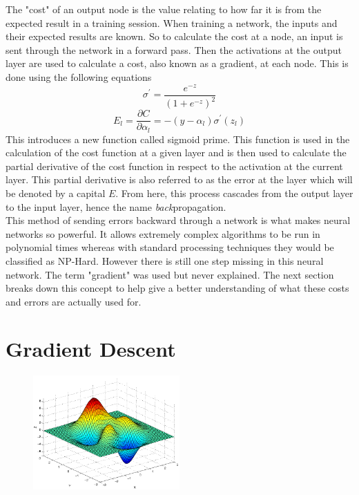 \documentclass[12pt]{article}
\theoremstyle{definition}
\theoremstyle{plain}
\begin{document}
The "cost" of an output node is the value relating to how far it is from the expected result in a training session. When training a network, the inputs and their expected results are known. So to calculate the cost at a node, an input is sent through the network in a forward pass. Then the activations at the output layer are used to calculate a cost, also known as a gradient, at each node. This is done using the following equations
\begin{equation*}
\sigma^\prime = \dfrac{e^{-z}}{(1+e^{-z})^2}
\end{equation*}
\begin{equation*}
E_l = \dfrac{\partial C}{\partial \alpha_l} = -(y - \alpha_l) \sigma^\prime(z_l)
\end{equation*}
This introduces a new function called sigmoid prime. This function is used in the calculation of the cost function at a given layer and is then used to calculate the partial derivative of the cost function in respect to the activation at the current layer. This partial derivative is also referred to as the error at the layer which will be denoted by a capital $E$. From here, this process cascades from the output layer to the input layer, hence the name \textit{back}propagation.\\

This method of sending errors backward through a network is what makes neural networks so powerful. It allows extremely complex algorithms to be run in polynomial times whereas with standard processing techniques they would be classified as NP-Hard. However there is still one step missing in this neural network. The term "gradient" was used but never explained. The next section breaks down this concept to help give a better understanding of what these costs and errors are actually used for.

\section*{Gradient Descent}
\begin{figure}
	\centering
	\includegraphics[width=0.50\textwidth]{Gradient.png}
\end{figure}
\end{document}

